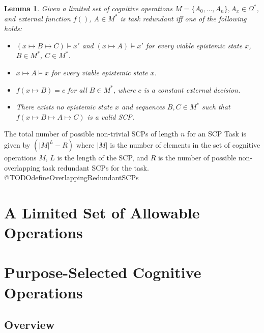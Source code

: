 \documentclass[
11pt, %
english, %
singlespacing, %
headsepline, %
]{MastersDoctoralThesis} %
\newtheorem{lemma}{Lemma}
\begin{document}
\begin{lemma} \label{lem:taskredundant}
Given a limited set of cognitive operations $M=\{A_0, ..., A_n\}, A_x \in \Omega^*$, and external function $f()$, $A \in M^*$ is task redundant iff one of the following holds:
\begin{itemize}
\item $(x \longmapsto B \longmapsto C) \models x'$ and $(x \longmapsto A) \models x'$ for every viable epistemic state $x$, $B \in M^*$, $C \in M^*$. 
\item $x \longmapsto A \models x$ for every viable epistemic state $x$.
\item $f(x \longmapsto B)=c$ for all $B \in M^*$, where $c$ is a constant external decision.
\item There exists no epistemic state $x$ and sequences $B, C \in M^*$ such that $f(x \longmapsto B \longmapsto A \longmapsto C)$ is a valid SCP.
\end{itemize}
\end{lemma}

The total number of possible non-trivial SCPs of length $n$ for an SCP Task is given by $(|M|^L - R)$ where $|M|$ is the number of elements in the set of cognitive operations $M$, $L$ is the length of the SCP, and $R$ is the number of possible non-overlapping task redundant SCPs for the task. @TODOdefineOverlappingRedundantSCPs


\section{A Limited Set of Allowable Operations}
\section{Purpose-Selected Cognitive Operations}
\subsection{Overview}
\end{document}

